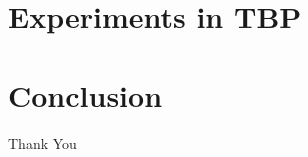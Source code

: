 \documentclass{beamer}
\begin{document}
\section{Experiments in TBP}


\section{Conclusion}


% 
%



\begin{frame}
\Huge{\centerline{Thank You}}
\end{frame}

\end{document}
